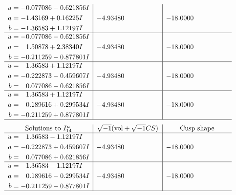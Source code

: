 \documentclass[1p]{elsarticle_modified}
\theoremstyle{definition}
\newcommand{\I}{\sqrt{-1}}
\begin{document}
$$\begin{array}{c|c|c}
\begin{aligned}
u &= -0.077086 - 0.621856 I \\
a &= -1.43169 + 0.16225 I \\
b &= -1.36583 + 1.12197 I\end{aligned}
 & -4.93480\phantom{ +0.000000I} & -18.0000\phantom{ +0.000000I} \\ \hline\begin{aligned}
u &= -0.077086 - 0.621856 I \\
a &= \phantom{-}1.50878 + 2.38340 I \\
b &= -0.211259 - 0.877801 I\end{aligned}
 & -4.93480\phantom{ +0.000000I} & -18.0000\phantom{ +0.000000I} \\ \hline\begin{aligned}
u &= \phantom{-}1.36583 + 1.12197 I \\
a &= -0.222873 - 0.459607 I \\
b &= \phantom{-}0.077086 - 0.621856 I\end{aligned}
 & -4.93480\phantom{ +0.000000I} & -18.0000\phantom{ +0.000000I} \\ \hline\begin{aligned}
u &= \phantom{-}1.36583 + 1.12197 I \\
a &= \phantom{-}0.189616 + 0.299534 I \\
b &= -0.211259 + 0.877801 I\end{aligned}
 & -4.93480\phantom{ +0.000000I} & -18.0000\phantom{ +0.000000I}\\
 \hline 
 \end{array}$$\newpage$$\begin{array}{c|c|c}  
\text{Solutions to }I^u_{14}& \I (\text{vol} + \sqrt{-1}CS) & \text{Cusp shape}\\
 \hline 
\begin{aligned}
u &= \phantom{-}1.36583 - 1.12197 I \\
a &= -0.222873 + 0.459607 I \\
b &= \phantom{-}0.077086 + 0.621856 I\end{aligned}
 & -4.93480\phantom{ +0.000000I} & -18.0000\phantom{ +0.000000I} \\ \hline\begin{aligned}
u &= \phantom{-}1.36583 - 1.12197 I \\
a &= \phantom{-}0.189616 - 0.299534 I \\
b &= -0.211259 - 0.877801 I\end{aligned}
 & -4.93480\phantom{ +0.000000I} & -18.0000\phantom{ +0.000000I}\\
 \hline 
 \end{array}$$\newpage\newpage\renewcommand{\arraystretch}{1}
\end{document}
